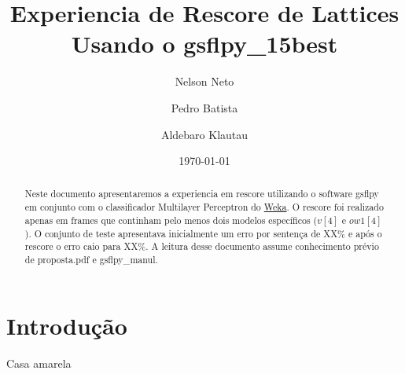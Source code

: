 \documentclass[a4paper]{article}
\author{Nelson Neto \and Pedro Batista \and Aldebaro Klautau}
\title{Experiencia de Rescore de Lattices Usando o gsflpy\_15best}
\begin{document}
\date{\today}

\maketitle

\begin{abstract}
Neste documento apresentaremos a experiencia em rescore utilizando
o software gsflpy em conjunto com o classificador Multilayer Perceptron
do \href{http://www.cs.waikato.ac.nz/ml/weka/}{Weka}. O rescore foi
realizado apenas em frames que continham pelo menos dois modelos
específicos ($v[4]$ e $ow1[4]$). O conjunto de teste apresentava inicialmente
um erro por sentença de XX\% e após o rescore o erro caio para XX\%.
A leitura desse documento assume conhecimento prévio de proposta.pdf e 
gsflpy\_manul.
\end{abstract}

\section{Introdução}

Casa amarela



\end{document}
